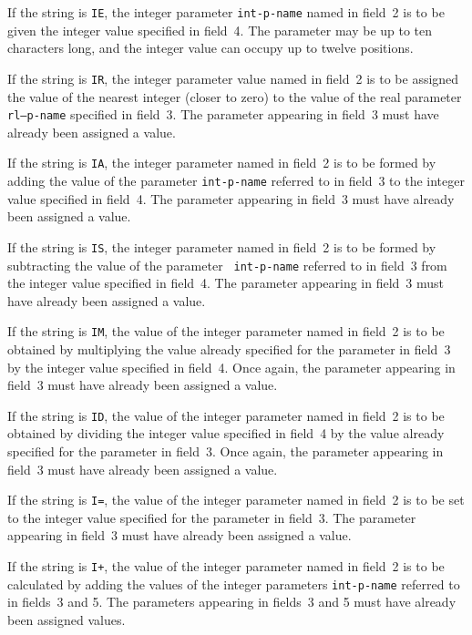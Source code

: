 \documentclass[a4paper]{article}
\begin{document}
If  the string is {\tt  IE},
the integer parameter
{\tt int-p-name}
named   in field~2  is   to be  given the  integer  value specified in
field~4.  The parameter  may  be  up to  ten characters long,  and the
integer value can occupy up to twelve positions.

If the string  is  {\tt IR},
the  integer parameter
value  named  in
field~2 is to be assigned the value of the nearest  integer (closer to
zero) to the value of the real parameter {\tt rl--p-name} specified
in field~3.  The parameter appearing in field~3 must have already been
assigned a value.

If the string is  {\tt IA},
the integer parameter  named in field~2 is
to be formed by adding the value  of  the parameter {\tt int-p-name}
referred to in field~3 to the integer value  specified in field~4. The
parameter appearing  in   field~3 must have  already   been assigned a
value.

If the string is {\tt  IS},
the  integer parameter named in field~2 is
to  be formed    by subtracting  the value    of    the parameter {\tt
int-p-name} referred to in field~3 from  the integer value specified
in field~4. The parameter appearing in field~3 must  have already been
assigned a value.

If the string is {\tt IM},
the value of the integer parameter named in
field~2  is to be obtained  by multiplying the value already specified
for  the   parameter  in  field~3 by   the integer  value specified in
field~4. Once  again, the parameter appearing  in  field~3  must have
already been assigned a value.

If the string is {\tt ID},
the value of the integer parameter named in
field~2 is to be obtained  by dividing the  integer value specified in
field~4 by the value already specified  for the  parameter in field~3.
Once again, the parameter appearing in field~3  must have already been
assigned a value.

If the string is {\tt I=},
the value of the integer parameter named in
field~2 is to be set to the  integer value specified for the parameter
in field~3.  The parameter appearing in field~3 must have already been
assigned a value.

If the string is {\tt I+},
the value of the integer parameter named in
field~2  is  to be  calculated by  adding   the values of the  integer
parameters  {\tt  int-p-name}  referred  to in  fields~3 and  5. The
parameters appearing in fields~3 and 5 must have already been assigned
values.
\end{document}
